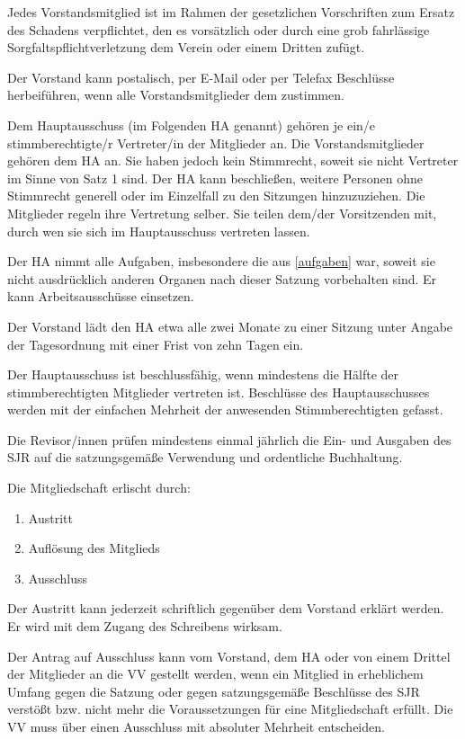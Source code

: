 \documentclass[10pt,a4paper,oneside,parskip=half]{scrartcl}
\begin{document}
\begin{contract}
Jedes Vorstandsmitglied ist im Rahmen der gesetzlichen Vorschriften zum Ersatz des Schadens verpflichtet, den es vorsätzlich oder durch eine grob fahrlässige Sorgfaltspflichtverletzung dem Verein oder einem Dritten zufügt.

Der Vorstand kann postalisch, per E-Mail oder per Telefax Beschlüsse herbeiführen, wenn alle Vorstandsmitglieder dem zustimmen.

Dem Hauptausschuss (im Folgenden HA genannt) gehören je ein/e stimmberechtigte/r Vertreter/in der Mitglieder an. Die Vorstandsmitglieder gehören dem HA an. Sie haben jedoch kein Stimmrecht, soweit sie nicht Vertreter im Sinne von Satz 1 sind. Der HA kann beschließen, weitere Personen ohne Stimmrecht generell oder im Einzelfall zu den Sitzungen hinzuzuziehen. Die Mitglieder regeln ihre Vertretung selber. Sie teilen dem/der Vorsitzenden mit, durch wen sie sich im Hauptausschuss vertreten lassen.

Der HA nimmt alle Aufgaben, insbesondere die aus \ref{aufgaben} war, soweit sie nicht ausdrücklich anderen Organen nach dieser Satzung vorbehalten sind. Er kann Arbeitsausschüsse einsetzen.

Der Vorstand lädt den HA etwa alle zwei Monate zu einer Sitzung unter Angabe der Tagesordnung mit einer Frist von zehn Tagen ein.

Der Hauptausschuss ist beschlussfähig, wenn mindestens die Hälfte der stimmberechtigten Mitglieder vertreten ist. Beschlüsse des Hauptausschusses werden mit der einfachen Mehrheit der anwesenden Stimmberechtigten gefasst.

Die Revisor/innen prüfen mindestens einmal jährlich die Ein- und Ausgaben des SJR auf die satzungsgemäße Verwendung und ordentliche Buchhaltung.

\label{mitgliedschaftsende}
Die Mitgliedschaft erlischt durch:
\begin{enumerate}
\item Austritt
\item Auflösung des Mitglieds
\item Ausschluss
\end{enumerate}

Der Austritt kann jederzeit schriftlich gegenüber dem Vorstand erklärt werden. Er wird mit dem Zugang des Schreibens wirksam.

Der Antrag auf Ausschluss kann vom Vorstand, dem HA oder von einem Drittel der Mitglieder an die VV gestellt werden, wenn ein Mitglied in erheblichem Umfang gegen die Satzung oder gegen satzungsgemäße Beschlüsse des SJR verstößt bzw. nicht mehr die Voraussetzungen für eine Mitgliedschaft erfüllt. Die VV muss über einen Ausschluss mit absoluter Mehrheit entscheiden.


\end{contract}
\end{document}
